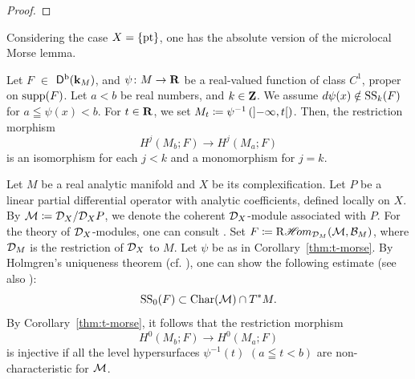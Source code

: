 \begin{proof}

\end{proof}

Considering the case \(X=\{\pt\}\), 
one has the absolute version of the microlocal Morse lemma.

\begin{Corollary+}\label{thm:t-morse}
  Let \(F\) \(\in\) \(\Dompb(\kk_M)\), and 
  \(\psi\colon M\to \rr\) be a real-valued function of 
  class \(C^1\), 
  proper on \(\supp(F)\). 
  Let \(a<b\) be real numbers, and \(k\in\zz\).
  We assume \(d\psi(x)\notin \muS[k](F)\) for \(
    a\leqq \psi(x)<b
  \). For \(t\in \rr\), we set \(
    M_t\coloneqq\psi^{-1}\left(\lopen-\infty,t\ropen\right)
  \). 
  Then, the restriction morphism \[
    H^{j}(M_{b};F)\to H^{j}(M_{a};F)
  \]
  is an isomorphism for each \(j< k\) and 
  a monomorphism for \(j=k\).
\end{Corollary+}

\begin{Example+}\label{eg:Holmgren}
  Let \(M\) be a real analytic manifold 
  and \(X\) be its complexification.
  Let \(P\) be a linear partial differential operator 
  with analytic coefficients, defined locally on \(X\). 
  By \(\cM\coloneqq \cD_{X}/\cD_{X}P\), we denote 
  the coherent \(\cD_{X}\)-module associated with \(P\). 
  For the theory of \(\cD_X\)-modules, one can consult \cite{Kas03}.
  Set \(F\coloneqq \RHOM_{\cD_{M}}(\cM,\cB_{M})\), where \(\cD_{M}\) is the restriction of \(\cD_{X}\) to \(M\). 
  Let \(\psi\) be as in Corollary~\ref{thm:t-morse}.
  By Holmgren's uniqueness theorem 
  (cf. \cite[Theorem~8.6.5]{Hor83}), 
  one can show the following 
  estimate (see also \cite[Example 3.8~(iv)]{KMS03a}):
  \[
    \muS[0](F)\subset\Char(\cM)\cap \cotb[M].
  \]
  By Corollary~\ref{thm:t-morse}, 
  it follows that the restriction morphism
  \[
    H^{0}(M_{b};F)\to H^{0}(M_{a};F)
  \]
  is injective 
  if all the level hypersurfaces 
  \(\psi^{-1}(t)\) \((a\leqq t < b)\) are non-characteristic 
  for \(\cM\).
\end{Example+}

